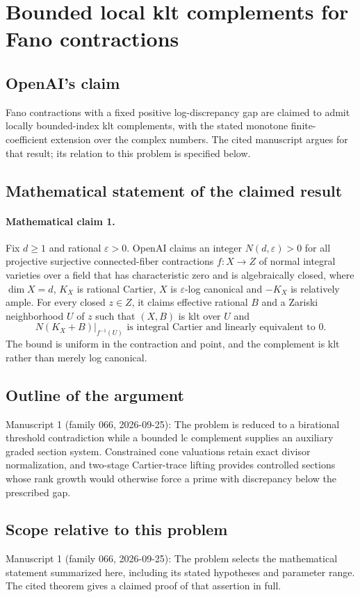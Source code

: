 \documentclass[11pt]{article}
\begin{document}
\section*{Bounded local klt complements for Fano contractions}

\subsection{OpenAI's claim}
Fano contractions with a fixed positive log-discrepancy gap are claimed to admit locally bounded-index klt complements, with the stated monotone finite-coefficient extension over the complex numbers. The cited manuscript argues for that result; its relation to this problem is specified below.

\subsection{Mathematical statement of the claimed result}
\paragraph{Mathematical claim 1.} Fix $d\ge1$ and rational $\varepsilon>0$. OpenAI claims an integer $N(d,\varepsilon)>0$ for all projective surjective connected-fiber contractions $f:X\to Z$ of normal integral varieties over a field that has characteristic zero and is algebraically closed, where $\dim X=d$, $K_X$ is rational Cartier, $X$ is $\varepsilon$-log canonical and $-K_X$ is relatively ample. For every closed $z\in Z$, it claims effective rational $B$ and a Zariski neighborhood $U$ of $z$ such that $(X,B)$ is klt over $U$ and
\[
N(K_X+B)|_{f^{-1}(U)}\text{ is integral Cartier and linearly equivalent to }0.
\]
The bound is uniform in the contraction and point, and the complement is klt rather than merely log canonical.

\subsection{Outline of the argument}
Manuscript 1 (family 066, 2026-09-25): The problem is reduced to a birational threshold contradiction while a bounded lc complement supplies an auxiliary graded section system. Constrained cone valuations retain exact divisor normalization, and two-stage Cartier-trace lifting provides controlled sections whose rank growth would otherwise force a prime with discrepancy below the prescribed gap.

\subsection{Scope relative to this problem}
Manuscript 1 (family 066, 2026-09-25): The problem selects the mathematical statement summarized here, including its stated hypotheses and parameter range. The cited theorem gives a claimed proof of that assertion in full.
\end{document}
